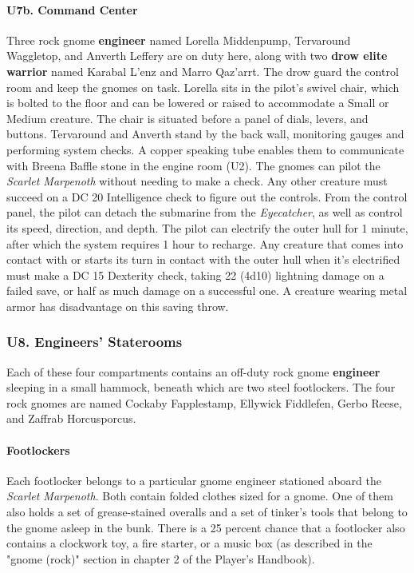 \documentclass[10pt,a4paper,twoside,twocolumn,openany,nodeprecatedcode]{dndbook}
\begin{document}
\paragraph{U7b. Command Center}
Three rock gnome \textbf{engineer} named Lorella Middenpump, Tervaround Waggletop, and Anverth Leffery are on duty here, along with two \textbf{drow elite warrior} named Karabal L'enz and Marro Qaz'arrt. The drow guard the control room and keep the gnomes on task.
Lorella sits in the pilot's swivel chair, which is bolted to the floor and can be lowered or raised to accommodate a Small or Medium creature. The chair is situated before a panel of dials, levers, and buttons. Tervaround and Anverth stand by the back wall, monitoring gauges and performing system checks. A copper speaking tube enables them to communicate with Breena Baffle stone in the engine room (U2).
The gnomes can pilot the \textit{Scarlet Marpenoth} without needing to make a check. Any other creature must succeed on a DC 20 Intelligence check to figure out the controls. From the control panel, the pilot can detach the submarine from the \textit{Eyecatcher}, as well as control its speed, direction, and depth. The pilot can electrify the outer hull for 1 minute, after which the system requires 1 hour to recharge. Any creature that comes into contact with or starts its turn in contact with the outer hull when it's electrified must make a DC 15 Dexterity check, taking 22 (4d10) lightning damage on a failed save, or half as much damage on a successful one. A creature wearing metal armor has disadvantage on this saving throw.
\subsubsection{U8. Engineers' Staterooms}
Each of these four compartments contains an off-duty rock gnome \textbf{engineer} sleeping in a small hammock, beneath which are two steel footlockers. The four rock gnomes are named Cockaby Fapplestamp, Ellywick Fiddlefen, Gerbo Reese, and Zaffrab Horcusporcus.
\paragraph{Footlockers}
Each footlocker belongs to a particular gnome engineer stationed aboard the \textit{Scarlet Marpenoth}. Both contain folded clothes sized for a gnome. One of them also holds a set of grease-stained overalls and a set of tinker's tools that belong to the gnome asleep in the bunk. There is a 25 percent chance that a footlocker also contains a clockwork toy, a fire starter, or a music box (as described in the "gnome (rock)" section in chapter 2 of the Player's Handbook).
\end{document}
